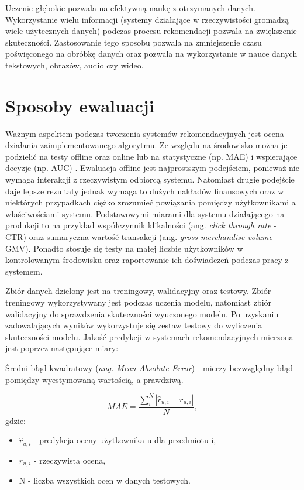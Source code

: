 Uczenie głębokie pozwala na efektywną naukę z otrzymanych danych. Wykorzystanie wielu informacji (systemy działające w rzeczywistości gromadzą wiele użytecznych danych) podczas procesu rekomendacji pozwala na zwiększenie skuteczności. Zastosowanie tego sposobu pozwala na zmniejszenie czasu poświęconego na obróbkę danych oraz pozwala na wykorzystanie w nauce danych tekstowych, obrazów, audio czy wideo.

\section{Sposoby ewaluacji}\label{metryki}

Ważnym aspektem podczas tworzenia systemów rekomendacyjnych jest ocena działania zaimplementowanego algorytmu. Ze względu na środowisko można je podzielić na testy offline oraz online lub na statystyczne (np. MAE) i wspierające decyzje (np. AUC) \cite{herlocker}. Ewaluacja offline jest najprostszym podejściem, ponieważ nie wymaga interakcji z rzeczywistym odbiorcą systemu. Natomiast drugie podejście daje lepsze rezultaty jednak wymaga to dużych nakładów finansowych oraz w niektórych przypadkach ciężko zrozumieć powiązania pomiędzy użytkownikami a właściwościami systemu. Podstawowymi miarami dla systemu działającego na produkcji to na przykład współczynnik klikalności (ang. \textit{click through rate} - CTR) oraz sumaryczna wartość transakcji (ang. \textit{gross merchandise volume} - GMV). Ponadto stosuje się testy na małej liczbie użytkowników w kontrolowanym środowisku oraz raportowanie ich doświadczeń podczas pracy z systemem.

Zbiór danych dzielony jest na treningowy, walidacyjny oraz testowy. Zbiór treningowy wykorzystywany jest podczas uczenia modelu, natomiast zbiór walidacyjny do sprawdzenia skuteczności wyuczonego modelu. Po uzyskaniu zadowalających wyników wykorzystuje się zestaw testowy do wyliczenia skuteczności modelu. Jakość predykcji w systemach rekomendacyjnych mierzona jest poprzez następujące miary:

Średni błąd kwadratowy (\textit{ang. Mean Absolute Error}) - mierzy bezwzględny błąd pomiędzy wyestymowaną wartością, a prawdziwą.

\begin{equation}
    MAE = \frac{\sum\limits_{i}^{N}|\hat{r}_{u,i} - r_{u,i}|}{N},
\end{equation} gdzie:
\begin{itemize}
    \item $\hat{r}_{u,i}$ - predykcja oceny użytkownika u dla przedmiotu i,
    \item $r_{u,i}$ - rzeczywista ocena,
    \item N - liczba wszystkich ocen w danych testowych.
\end{itemize}

